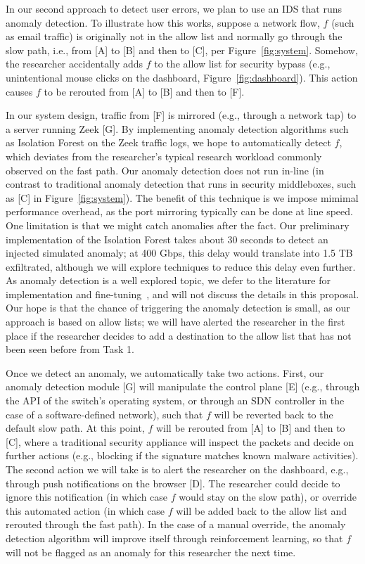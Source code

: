 In our second approach to detect user errors, we plan to use an IDS that runs anomaly detection. To illustrate how this works, suppose a network flow, $f$ (such as email traffic) is originally not in the allow list and normally go through the slow path, i.e., from [A] to [B] and then to [C], per Figure~\ref{fig:system}. Somehow, the researcher accidentally adds $f$ to the allow list for security bypass (e.g., unintentional mouse clicks on the dashboard, Figure~\ref{fig:dashboard}). This action causes $f$ to be rerouted from [A] to [B] and then to [F].

In our system design, traffic from [F] is mirrored (e.g., through a network tap) to a server running Zeek [G]. By implementing anomaly detection algorithms such as Isolation Forest on the Zeek traffic logs, we hope to automatically detect $f$, which deviates from the researcher's typical research workload commonly observed on the fast path. Our anomaly detection does not run in-line (in contrast to traditional anomaly detection that runs in security middleboxes, such as [C] in Figure~\ref{fig:system}). The benefit of this technique is we impose mimimal performance overhead, as the port mirroring typically can be done at line speed. One limitation is that we might catch anomalies after the fact. Our preliminary implementation of the Isolation Forest takes about 30 seconds to detect an injected simulated anomaly; at 400 Gbps, this delay would translate into 1.5 TB exfiltrated, although we will explore techniques to reduce this delay even further. As anomaly detection is a well explored topic, we defer to the literature for implementation and fine-tuning~\cite{barradas2021flowlens}, and will not discuss the details in this proposal. Our hope is that the chance of triggering the anomaly detection is small, as our approach is based on allow lists;  we will have alerted the researcher in the first place if the researcher decides to add a destination to the allow list that has not been seen before from Task 1.

Once we detect an anomaly, we automatically take two actions. First, our anomaly detection module [G] will manipulate the control plane [E] (e.g., through the API of the switch's operating system, or through an SDN controller in the case of a software-defined network), such that $f$ will be reverted back to the default slow path. At this point, $f$ will be rerouted from [A] to [B] and then to [C], where a traditional security appliance will inspect the packets and decide on further actions (e.g., blocking if the signature matches known malware activities). The second action we will take is to alert the researcher on the dashboard, e.g., through push notifications on the browser [D]. The researcher could decide to ignore this notification (in which case $f$ would stay on the slow path), or override this automated action (in which case $f$ will be added back to the allow list and rerouted through the fast path). In the case of a manual override, the anomaly detection algorithm will improve itself through reinforcement learning, so that $f$ will not be flagged as an anomaly for this researcher the next time.

